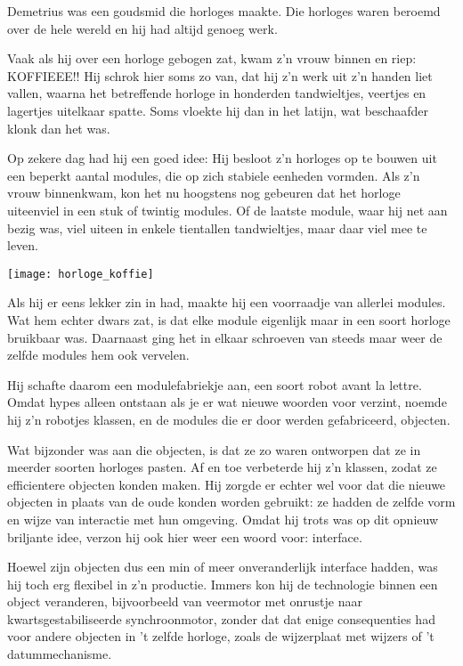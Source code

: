 \documentclass[a4paper,10pt]{article}
\begin{document}
\begin{framed}
Demetrius was een goudsmid die horloges maakte.
Die horloges waren beroemd over de hele wereld en hij had altijd genoeg werk.

Vaak als hij over een horloge gebogen zat, kwam z'n vrouw binnen en riep: KOFFIEEE!!
Hij schrok hier soms zo van, dat hij z'n werk uit z'n handen liet vallen,
waarna het betreffende horloge in honderden tandwieltjes, veertjes en lagertjes uitelkaar spatte.
Soms vloekte hij dan in het latijn, wat beschaafder klonk dan het was.

Op zekere dag had hij een goed idee:
Hij besloot z'n horloges op te bouwen uit een beperkt aantal modules, die op zich stabiele eenheden vormden.
Als z'n vrouw binnenkwam, kon het nu hoogstens nog gebeuren dat het horloge uiteenviel in een stuk of twintig modules.
Of de laatste module, waar hij net aan bezig was, viel uiteen in enkele tientallen tandwieltjes, maar daar viel mee te leven.

\texttt{[image: horloge\_koffie]}

Als hij er eens lekker zin in had, maakte hij een voorraadje van allerlei modules.
Wat hem echter dwars zat, is dat elke module eigenlijk maar in een soort horloge bruikbaar was.
Daarnaast ging het in elkaar schroeven van steeds maar weer de zelfde modules hem ook vervelen.

Hij schafte daarom een modulefabriekje aan, een soort robot avant la lettre.
Omdat hypes alleen ontstaan als je er wat nieuwe woorden voor verzint,
noemde hij z'n robotjes klassen, en de modules die er door werden gefabriceerd, objecten.

Wat bijzonder was aan die objecten, is dat ze zo waren ontworpen dat ze in meerder soorten horloges pasten.
Af en toe verbeterde hij z'n klassen, zodat ze efficientere objecten konden maken.
Hij zorgde er echter wel voor dat die nieuwe objecten in plaats van de oude konden worden gebruikt:
ze hadden de zelfde vorm en wijze van interactie met hun omgeving.
Omdat hij trots was op dit opnieuw briljante idee, verzon hij ook hier weer een woord voor: interface.

Hoewel zijn objecten dus een min of meer onveranderlijk interface hadden, was hij toch erg flexibel in z'n productie.
Immers kon hij de technologie binnen een object veranderen,
bijvoorbeeld van veermotor met onrustje naar kwartsgestabiliseerde synchroonmotor,
zonder dat dat enige consequenties had voor andere objecten in 't zelfde horloge,
zoals de wijzerplaat met wijzers of 't datummechanisme.


\end{framed}
\end{document}
